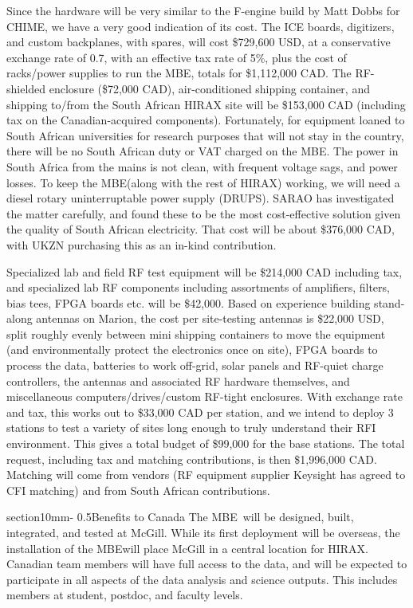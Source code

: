 \documentclass[letterpaper,11pt,preprint]{aastex}
\makeatletter
\newcommand{\mbe}{{\rm MBE}}
\renewcommand{\section}{\@startsection%
{section}{1}{0mm}{-\baselineskip}%
{0.5\baselineskip}{\normalfont\Large\bfseries}}%
\makeatother
\begin{document}
Since the hardware will be very
similar to the F-engine build by Matt Dobbs for CHIME, we have a very
good indication of its cost.  The ICE boards, digitizers, and custom
backplanes, with spares, will cost \$729,600 USD, at a conservative
exchange rate of 0.7, with an effective tax rate of 5\%, plus the cost
of racks/power supplies to run the \mbe, totals for
\$1,112,000 CAD.  The RF-shielded enclosure (\$72,000 CAD),
air-conditioned shipping container, and shipping to/from the South
African HIRAX site will be \$153,000 CAD (including tax on the
Canadian-acquired components).  Fortunately, for equipment loaned to
South African universities for research purposes that will not stay in
the country, there will be no South African duty or VAT charged on the
\mbe.  The power in South Africa from the mains is not clean, with
frequent voltage sags, and power losses.  To keep the \mbe (along with
the rest of HIRAX) working, we will need a diesel rotary
uninterruptable power supply (DRUPS).  SARAO has investigated the
matter carefully, and found these to be the most cost-effective
solution given the quality of South African electricity.  That cost
will be about \$376,000 CAD, with UKZN
purchasing this as an in-kind contribution.  

Specialized lab and field RF test equipment will be \$214,000 CAD
including tax, and specialized lab RF components including assortments
of amplifiers, filters, bias tees, FPGA boards etc. will be \$42,000.
Based on experience building stand-along antennas on Marion, the cost
per site-testing antennas is \$22,000 USD, split roughly evenly
between mini shipping containers to move the equipment (and
environmentally protect the electronics once on site), FPGA boards to
process the data, batteries to work off-grid, solar panels and
RF-quiet charge controllers, the antennas and associated RF hardware
themselves, and miscellaneous computers/drives/custom RF-tight
enclosures.  With exchange rate and tax, this works out to \$33,000
CAD per station, and we intend to deploy 3 stations to test a variety
of sites long enough to truly understand their RFI environment.  This
gives a total budget of \$99,000 for the base stations.  The total
request, including tax and matching contributions, is then \$1,996,000
CAD.  Matching will come from vendors (RF equipment supplier Keysight
has agreed to CFI matching) and from South African contributions.


\section{Benefits to Canada}
The \mbe\ will be designed, built, integrated, and tested at McGill.
While its first deployment will be overseas, the installation of the
\mbe will place McGill in a central location for HIRAX.  Canadian team
members will have full access to the data, and will be expected to
participate in all aspects of the data analysis and science outputs.
This includes members at student, postdoc, and faculty levels.  
\end{document}
